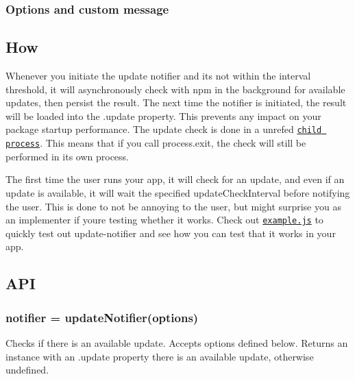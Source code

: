 \subsubsection*{Options and custom message}




\subsection*{How}

Whenever you initiate the update notifier and it\textquotesingle{}s not within the interval threshold, it will asynchronously check with npm in the background for available updates, then persist the result. The next time the notifier is initiated, the result will be loaded into the {\ttfamily .update} property. This prevents any impact on your package startup performance. The update check is done in a unref\textquotesingle{}ed \href{https://nodejs.org/api/child_process.html#child_process_child_process_spawn_command_args_options}{\tt child process}. This means that if you call {\ttfamily process.\+exit}, the check will still be performed in its own process.

The first time the user runs your app, it will check for an update, and even if an update is available, it will wait the specified {\ttfamily update\+Check\+Interval} before notifying the user. This is done to not be annoying to the user, but might surprise you as an implementer if you\textquotesingle{}re testing whether it works. Check out \href{example.js}{\tt {\ttfamily example.\+js}} to quickly test out {\ttfamily update-\/notifier} and see how you can test that it works in your app.

\subsection*{A\+PI}

\subsubsection*{notifier = update\+Notifier(options)}

Checks if there is an available update. Accepts options defined below. Returns an instance with an {\ttfamily .update} property there is an available update, otherwise {\ttfamily undefined}.

